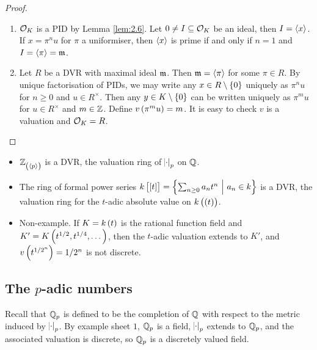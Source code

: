 \begin{proof}
\hfill
\begin{enumerate}
\item $ \mathcal{O}_K $ is a PID by Lemma \ref{lem:2.6}. Let $ 0 \ne I \subseteq \mathcal{O}_K $ be an ideal, then $ I = \left\langle x \right\rangle $. If $ x = \pi^nu $ for $ \pi $ a uniformiser, then $ \left\langle x \right\rangle $ is prime if and only if $ n = 1 $ and $ I = \left\langle \pi \right\rangle = \mathfrak{m} $.
\item Let $ R $ be a DVR with maximal ideal $ \mathfrak{m} $. Then $ \mathfrak{m} = \left\langle \pi \right\rangle $ for some $ \pi \in R $. By unique factorisation of PIDs, we may write any $ x \in R \setminus \cbr{0} $ uniquely as $ \pi^nu $ for $ n \ge 0 $ and $ u \in R^\times $. Then any $ y \in K \setminus \cbr{0} $ can be written uniquely as $ \pi^mu $ for $ u \in R^\times $ and $ m \in \mathbb{Z} $. Define $ v\br{\pi^mu} = m $. It is easy to check $ v $ is a valuation and $ \mathcal{O}_K = R $.
\end{enumerate}
\end{proof}

\begin{example*}
\hfill
\begin{itemize}
\item $ \ZZ_{\br{\abr{p}}} $ is a DVR, the valuation ring of $ \abs{\cdot}_p $ on $ \mathbb{Q} $.
\item The ring of formal power series $ k\sbr{\sbr{t}} = \cbr{\sum_{n \ge 0} a_nt^n \st a_n \in k} $ is a DVR, the valuation ring for the $ t $-adic absolute value on $ k\br{\br{t}} $.
\item Non-example. If $ K = k\br{t} $ is the rational function field and $ K' = K\br{t^{1 / 2}, t^{1 / 4}, \dots} $, then the $ t $-adic valuation extends to $ K' $, and $ v\br{t^{1 / 2^n}} = 1 / 2^n $ is not discrete.
\end{itemize}
\end{example*}

\pagebreak

\subsection{The \texorpdfstring{$ p $}{p}-adic numbers}


Recall that $ \mathbb{Q}_p $ is defined to be the completion of $ \mathbb{Q} $ with respect to the metric induced by $ \abs{\cdot}_p $. By example sheet $ 1 $, $ \mathbb{Q}_p $ is a field, $ \abs{\cdot}_p $ extends to $ \mathbb{Q}_p $, and the associated valuation is discrete, so $ \mathbb{Q}_p $ is a discretely valued field.

